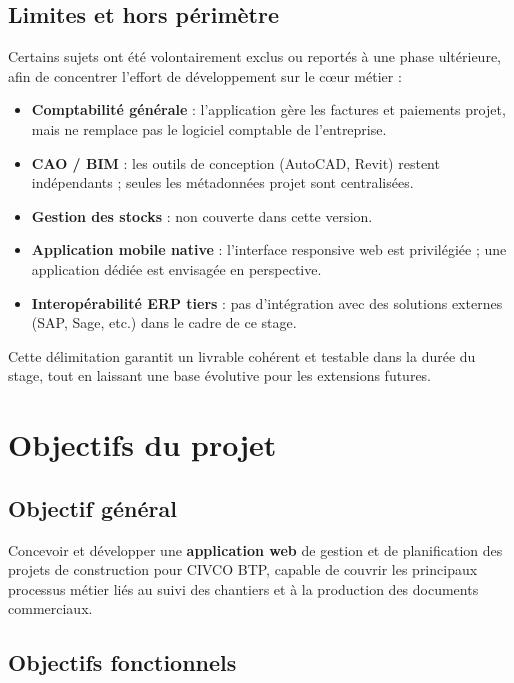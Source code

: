 \subsection{Limites et hors périmètre}

Certains sujets ont été volontairement exclus ou reportés à une phase ultérieure,
afin de concentrer l'effort de développement sur le cœur métier :

\begin{itemize}
  \item \textbf{Comptabilité générale} : l'application gère les factures et
  paiements projet, mais ne remplace pas le logiciel comptable de l'entreprise.
  \item \textbf{CAO / BIM} : les outils de conception (AutoCAD, Revit) restent
  indépendants ; seules les métadonnées projet sont centralisées.
  \item \textbf{Gestion des stocks} : non couverte dans cette version.
  \item \textbf{Application mobile native} : l'interface responsive web est
  privilégiée ; une application dédiée est envisagée en perspective.
  \item \textbf{Interopérabilité ERP tiers} : pas d'intégration avec des solutions
  externes (SAP, Sage, etc.) dans le cadre de ce stage.
\end{itemize}

Cette délimitation garantit un livrable cohérent et testable dans la durée du stage,
tout en laissant une base évolutive pour les extensions futures.

\section{Objectifs du projet}

\subsection{Objectif général}

Concevoir et développer une \textbf{application web} de gestion et de planification des
projets de construction pour CIVCO BTP, capable de couvrir les principaux processus métier
liés au suivi des chantiers et à la production des documents commerciaux.

\subsection{Objectifs fonctionnels}

